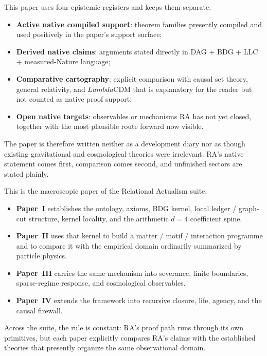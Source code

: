 \documentclass[11pt]{article}
\def\Lambda{Lambda}%
\begin{document}
\begin{tcolorbox}[title=Epistemic Status of This Paper,colback=gray!5,colframe=gray!60]
This paper uses four epistemic registers and keeps them separate:
\begin{itemize}[nosep]
    \item \textbf{Active native compiled support}: theorem families presently compiled and used positively in the paper's support surface;
    \item \textbf{Derived native claims}: arguments stated directly in DAG + BDG + LLC + measured-Nature language;
    \item \textbf{Comparative cartography}: explicit comparison with causal set theory, general relativity, and $\Lambda$CDM that is explanatory for the reader but not counted as native proof support;
    \item \textbf{Open native targets}: observables or mechanisms RA has not yet closed, together with the most plausible route forward now visible.
\end{itemize}
The paper is therefore written neither as a development diary nor as though existing gravitational and cosmological theories were irrelevant. RA's native statement comes first, comparison comes second, and unfinished sectors are stated plainly.
\end{tcolorbox}

\begin{tcolorbox}[title=Place of This Paper in the RA Suite,colback=gray!5,colframe=gray!60]
This is the macroscopic paper of the Relational Actualism suite.
\begin{itemize}[nosep]
    \item \textbf{Paper~I} establishes the ontology, axioms, BDG kernel, local ledger / graph-cut structure, kernel locality, and the arithmetic $d=4$ coefficient spine.
    \item \textbf{Paper~II} uses that kernel to build a matter / motif / interaction programme and to compare it with the empirical domain ordinarily summarized by particle physics.
    \item \textbf{Paper~III} carries the same mechanism into severance, finite boundaries, sparse-regime response, and cosmological observables.
    \item \textbf{Paper~IV} extends the framework into recursive closure, life, agency, and the causal firewall.
\end{itemize}
Across the suite, the rule is constant: RA's proof path runs through its own primitives, but each paper explicitly compares RA's claims with the established theories that presently organize the same observational domain.
\end{tcolorbox}
\end{document}

